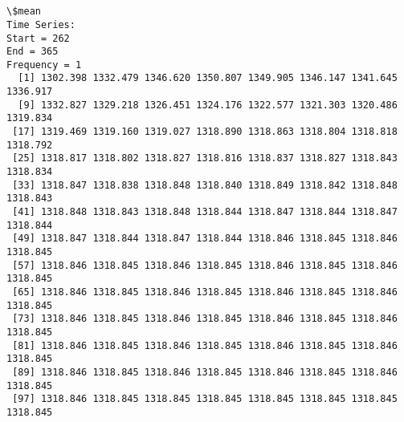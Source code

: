 \documentclass[11pt]{article}
\begin{document}
    \begin{center}
    \end{center}
    { \hspace*{\fill} \\}
    
    \begin{center}
    \end{center}
    { \hspace*{\fill} \\}
    
    \begin{Verbatim}[commandchars=\\\{\}]
\$mean
Time Series:
Start = 262 
End = 365 
Frequency = 1 
  [1] 1302.398 1332.479 1346.620 1350.807 1349.905 1346.147 1341.645 1336.917
  [9] 1332.827 1329.218 1326.451 1324.176 1322.577 1321.303 1320.486 1319.834
 [17] 1319.469 1319.160 1319.027 1318.890 1318.863 1318.804 1318.818 1318.792
 [25] 1318.817 1318.802 1318.827 1318.816 1318.837 1318.827 1318.843 1318.834
 [33] 1318.847 1318.838 1318.848 1318.840 1318.849 1318.842 1318.848 1318.843
 [41] 1318.848 1318.843 1318.848 1318.844 1318.847 1318.844 1318.847 1318.844
 [49] 1318.847 1318.844 1318.847 1318.844 1318.846 1318.845 1318.846 1318.845
 [57] 1318.846 1318.845 1318.846 1318.845 1318.846 1318.845 1318.846 1318.845
 [65] 1318.846 1318.845 1318.846 1318.845 1318.846 1318.845 1318.846 1318.845
 [73] 1318.846 1318.845 1318.846 1318.845 1318.846 1318.845 1318.846 1318.845
 [81] 1318.846 1318.845 1318.846 1318.845 1318.846 1318.845 1318.846 1318.845
 [89] 1318.846 1318.845 1318.846 1318.845 1318.846 1318.845 1318.846 1318.845
 [97] 1318.846 1318.845 1318.845 1318.845 1318.845 1318.845 1318.845 1318.845


\end{Verbatim}
\end{document}
